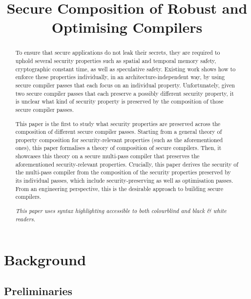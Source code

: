 \documentclass[a4paper,12pt]{article}
\title{Secure Composition of Robust and Optimising Compilers}
\begin{document}
\maketitle

\begin{abstract}
To ensure that secure applications do not leak their secrets, they are required to uphold several security properties such as spatial and temporal memory safety, cryptographic constant time, as well as speculative safety.
Existing work shows how to enforce these properties individually, in an architecture-independent way, by using secure compiler passes that each focus on an individual property.
Unfortunately, given two secure compiler passes that each preserve a possibly different security property, it is unclear what kind of security property is preserved by the composition of those secure compiler passes.

This paper is the first to study what security properties are preserved across the composition of different secure compiler passes.
Starting from a general theory of property composition for security-relevant properties (such as the aforementioned ones), this paper formalises a theory of composition of secure compilers.
Then, it showcases this theory on a secure multi-pass compiler that preserves the aforementioned security-relevant properties.
Crucially, this paper derives the security of the multi-pass compiler from the composition of the security properties preserved by its individual passes, which include security-preserving as well as optimisation passes.
% 
From an engineering perspective, this is the desirable approach to building secure compilers.
\begin{center}\small\it
	{This paper uses syntax highlighting accessible to both colourblind and black \& white readers.}
\end{center}
\end{abstract}

\appendix

\section{Background}

\subsection{Preliminaries}
\end{document}
